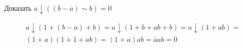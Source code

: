 \begin{task}
    Доказать $a \downarrow ((b - a) \sim b) = 0$
    \begin{solution}
        \begin{multline*}
            a \downarrow (1 + (b - a) + b) = a \downarrow (1 + b + ab + b) = a \downarrow (1 + ab) = \\
            (1 + a)(1 + 1 + ab) = (1 + a)ab = \overline a ab = 0
        \end{multline*}
    \end{solution}
\end{task}

